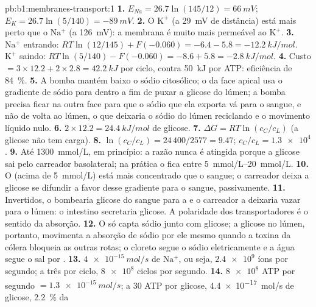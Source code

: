 \begin{solution}{pb:b1:membranes-transport:1}
\textbf{1.} $E_{Na} = 26.7\ln(145/12) = \qty{+66}{mV}$; $E_K =
26.7\ln(5/140) = \qty{-89}{mV}$.
\textbf{2.} O $\mathrm{K^+}$ (a \qty{29}{mV} de distância) está mais
perto que o $\mathrm{Na^+}$ (a \qty{126}{mV}): a membrana é muito mais
permeável ao $\mathrm{K^+}$.
\textbf{3.} $\mathrm{Na^+}$ entrando: $RT\ln(12/145) + F(-0.060) = -6.4 -
5.8 = \qty{-12.2}{kJ/mol}$. $\mathrm{K^+}$ saindo: $RT\ln(5/140) -
F(-0.060) = -8.6 + 5.8 = \qty{-2.8}{kJ/mol}$.
\textbf{4.} Custo $= 3\times 12.2 + 2\times 2.8 = \qty{42.2}{kJ}$ por
ciclo, contra \qty{50}{kJ} por ATP: eficiência de \qty{84}{\%}.
\textbf{5.} A bomba mantém baixo o sódio citosólico; o  da
face apical usa o gradiente de sódio para dentro a fim de puxar a
glicose do lúmen; a bomba precisa ficar na outra face para que o sódio
que ela exporta vá para o sangue, e não de volta ao lúmen, o que
deixaria o sódio do lúmen reciclando e o movimento líquido nulo.
\textbf{6.} $2\times 12.2 = \qty{24.4}{kJ/mol}$ de glicose.
\textbf{7.} $\Delta G = RT\ln(c_C/c_L)$ (a glicose não tem carga).
\textbf{8.} $\ln(c_C/c_L) = 24\,400/2577 = 9.47$; $c_C/c_L =
\num{1.3e4}$.
\textbf{9.} Até \qty{1300}{mmol/L}, em princípio: a razão nunca é
atingida porque a glicose sai pelo carreador basolateral; na prática o
 fica entre \qtyrange{5}{20}{mmol/L}.
\textbf{10.} O  (acima de \qty{5}{mmol/L}) está mais concentrado
que o sangue; o carreador deixa a glicose se difundir a favor desse
gradiente para o sangue, passivamente.
\textbf{11.} Invertidos, o  bombearia glicose do sangue para
a  e o carreador a deixaria vazar para o lúmen: o intestino
secretaria glicose. A polaridade dos transportadores é o sentido da
absorção.
\textbf{12.} O  só capta sódio junto com glicose; a glicose
no lúmen, portanto, movimenta a absorção de sódio por ele mesmo quando a
toxina da cólera bloqueia as outras rotas; o cloreto segue o sódio
eletricamente e a água segue o sal por .
\textbf{13.} $\qty{4e-15}{mol/s}$ de $\mathrm{Na^+}$, ou seja,
$\num{2.4e9}$ íons por segundo; a três por ciclo, $\num{8e8}$ ciclos por
segundo.
\textbf{14.} $\num{8e8}$ ATP por segundo $= \qty{1.3e-15}{mol/s}$; a 30
ATP por glicose, \qty{4.4e-17}{mol/s} de glicose, \qty{2.2}{\%} da

\end{solution}
